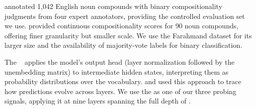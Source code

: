 \citet{farahmand2015multiword} annotated 1,042 English noun compounds with binary compositionality judgments from four expert annotators, providing the controlled evaluation set we use.
\citet{reddy2011empirical} provided continuous compositionality scores for 90 noun compounds, offering finer granularity but smaller scale.
We use the Farahmand dataset for its larger size and the availability of majority-vote labels for binary classification.

The \logitlens~\citep{nostalgebraist2020logitlens} applies the model's output head (layer normalization followed by the unembedding matrix) to intermediate hidden states, interpreting them as probability distributions over the vocabulary.
\citet{din2023jump} and \citet{geva2022transformer} used this approach to trace how predictions evolve across layers.
We use the \logitlens as one of our three probing signals, applying it at nine layers spanning the full depth of \gptxl.
